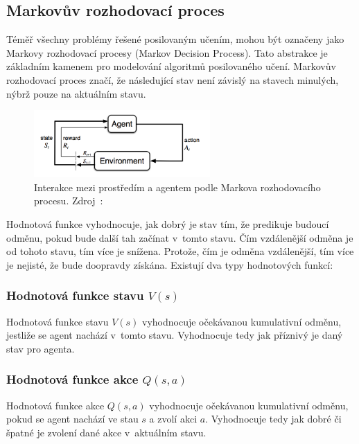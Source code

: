 \subsection{Markovův rozhodovací proces}\label{subsec:markovovy-rozhodovaci-proces}

  Téměř všechny problémy řešené posilovaným učením, mohou být označeny jako Markovy rozhodovací procesy (Markov Decision Process).
  Tato abstrakce je základním kamenem pro modelování algoritmů posilovaného učení.
  Markovův rozhodovací proces značí, že následující stav není závislý na stavech minulých, nýbrž pouze na aktuálním stavu.
  
  \begin{figure}[H]
    \centering
    \includegraphics[width=0.6\textwidth]{obrazky-figures/RL_basics}
    \caption{Interakce mezi prostředím a agentem podle Markova rozhodovacího procesu.
    Zdroj~\cite{RL_basics}:}\label{fig:markov}
  \end{figure}
  \begin{definition}
  \end{definition}

Hodnotová funkce vyhodnocuje, jak dobrý je stav tím, že predikuje budoucí odměnu, pokud bude další tah začínat v~tomto stavu.
Čím vzdálenější odměna je od tohoto stavu, tím více je snížena.
Protože, čím je odměna vzdálenější, tím více je nejisté, že bude doopravdy získána.
Existují dva typy hodnotových funkcí:

\subsubsection*{Hodnotová funkce stavu $V(s)$}

Hodnotová funkce stavu \emph{$V(s)$} vyhodnocuje očekávanou kumulativní odměnu, jestliže se agent nachází v~tomto stavu.
Vyhodnocuje tedy jak příznivý je daný stav pro agenta.

\subsubsection*{Hodnotová funkce akce $Q(s, a)$}
\label{subsubsec:q_function}

Hodnotová funkce akce \emph{$Q(s, a)$} vyhodnocuje očekávanou kumulativní odměnu, pokud se agent nachází ve stau $s$ a zvolí akci $a$.
Vyhodnocuje tedy jak dobré či špatné je zvolení dané akce v~aktuálním stavu.


